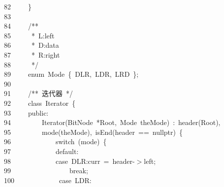 \documentclass[11pt,a4paper]{ctexart}
\newcommand{\hlstd}[1]{\textcolor[rgb]{0.2,0.2,0.2}{#1}}
\newcommand{\hlcom}[1]{\textcolor[rgb]{0.59,0.59,0.59}{#1}}
\newcommand{\hlopt}[1]{\textcolor[rgb]{0.2,0.2,0.2}{#1}}
\newcommand{\hllin}[1]{\textcolor[rgb]{0.59,0.59,0.59}{#1}}
\newcommand{\hlkwa}[1]{\textcolor[rgb]{0.23,0.42,0.78}{#1}}
\newcommand{\hlkwb}[1]{\textcolor[rgb]{0.63,0,0.31}{#1}}
\newcommand{\hlkwc}[1]{\textcolor[rgb]{0,0.63,0.31}{#1}}
\newcommand{\hlkwd}[1]{\textcolor[rgb]{0.78,0.23,0.41}{#1}}
\begin{document}
\hllin{82\ }\hlstd{}\hlstd{\ \ \ \ }\hlstd{}\hlopt{\}}\\
\hllin{83\ }\hlstd{}\\
\hllin{84\ }\hlstd{}\hlstd{\ \ \ \ }\hlstd{}\hlcom{/{*}{*}}\\
\hllin{85\ }\hlcom{}\hlstd{\ \ \ \ \ }\hlcom{{*}\ L:left}\\
\hllin{86\ }\hlcom{}\hlstd{\ \ \ \ \ }\hlcom{{*}\ D:data}\\
\hllin{87\ }\hlcom{}\hlstd{\ \ \ \ \ }\hlcom{{*}\ R:right}\\
\hllin{88\ }\hlcom{}\hlstd{\ \ \ \ \ }\hlcom{{*}/}\hlstd{}\\
\hllin{89\ }\hlstd{}\hlstd{\ \ \ \ }\hlstd{}\hlkwb{enum\ }\hlstd{Mode\ }\hlopt{\{\ }\hlstd{DLR}\hlopt{,\ }\hlstd{LDR}\hlopt{,\ }\hlstd{LRD\ }\hlopt{\};}\\
\hllin{90\ }\hlstd{}\\
\hllin{91\ }\hlstd{}\hlstd{\ \ \ \ }\hlstd{}\hlcom{/{*}{*}\ 迭代器\ {*}/}\hlstd{}\\
\hllin{92\ }\hlstd{}\hlstd{\ \ \ \ }\hlstd{}\hlkwc{class\ }\hlstd{Iterator\ }\hlopt{\{}\\
\hllin{93\ }\hlstd{}\hlstd{\ \ \ \ }\hlstd{}\hlkwc{public}\hlstd{}\hlopt{:}\\
\hllin{94\ }\hlstd{}\hlstd{\ \ \ \ \ \ \ \ }\hlstd{}\hlkwd{Iterator}\hlstd{}\hlopt{(}\hlstd{BitNode\ }\hlopt{{*}}\hlstd{Root}\hlopt{,\ }\hlstd{Mode\ theMode}\hlopt{)\ :\ }\hlstd{}\hlkwd{header}\hlstd{}\hlopt{(}\hlstd{Root}\hlopt{),}\Righttorque\\
\hllin{95\ }\hlstd{}\hlstd{\ \ \ \ \ \ \ \ }\hlstd{}\hlkwd{mode}\hlstd{}\hlopt{(}\hlstd{theMode}\hlopt{),\ }\hlstd{}\hlkwd{isEnd}\hlstd{}\hlopt{(}\hlstd{header\ }\hlopt{==\ }\hlstd{}\hlkwc{nullptr}\hlstd{}\hlopt{)\ \{}\\
\hllin{96\ }\hlstd{}\hlstd{\ \ \ \ \ \ \ \ \ \ \ \ }\hlstd{}\hlkwa{switch\ }\hlstd{}\hlopt{(}\hlstd{mode}\hlopt{)\ \{}\\
\hllin{97\ }\hlstd{}\hlstd{\ \ \ \ \ \ \ \ \ \ \ \ }\hlstd{}\hlkwa{default}\hlstd{}\hlopt{:}\\
\hllin{98\ }\hlstd{}\hlstd{\ \ \ \ \ \ \ \ \ \ \ \ }\hlstd{}\hlkwa{case\ }\hlstd{DLR}\hlopt{:}\hlstd{curr\ }\hlopt{=\ }\hlstd{header}\hlopt{{-}$>$}\hlstd{left}\hlopt{;}\\
\hllin{99\ }\hlstd{}\hlstd{\ \ \ \ \ \ \ \ \ \ \ \ \ \ \ \ }\hlstd{}\hlkwa{break}\hlstd{}\hlopt{;}\\
\hllin{100\ }\hlstd{}\hlstd{\ \ \ \ \ \ \ \ \ \ \ \ }\hlstd{}\hlkwa{case\ }\hlstd{LDR}\hlopt{:}\\
\end{document}

